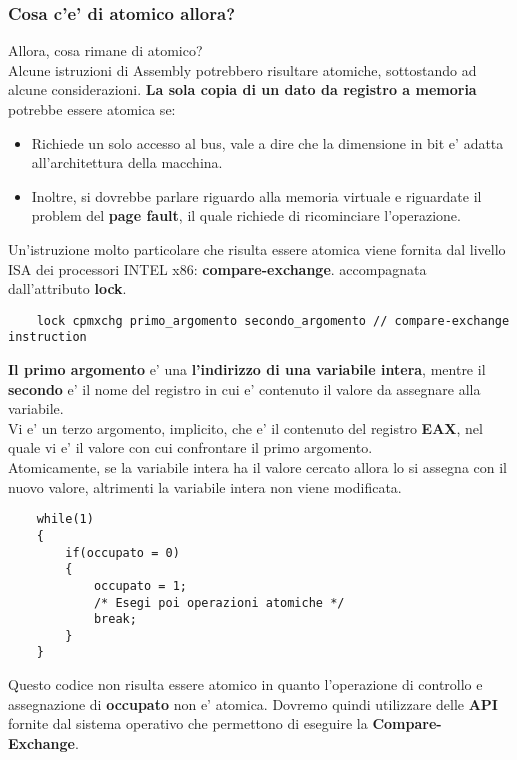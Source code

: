 \documentclass{article}
\begin{document}
        \subsubsection{Cosa c'e' di atomico allora?}
            Allora, cosa rimane di atomico?
            \\
            Alcune istruzioni di Assembly potrebbero risultare atomiche, sottostando ad alcune considerazioni.
            \textbf{La sola copia di un dato da registro a memoria } 
            potrebbe essere atomica se:
            \begin{itemize}
               \item Richiede un solo accesso al bus, vale a dire che 
               la dimensione in bit e' adatta all'architettura della 
               macchina.
               \item Inoltre, si dovrebbe parlare riguardo alla memoria 
                virtuale e riguardate il problem del \textbf{page fault},
                il quale richiede di ricominciare l'operazione.
            \end{itemize}
            Un'istruzione molto particolare che risulta essere atomica
            viene fornita dal livello ISA dei processori INTEL x86: \textbf{compare-exchange}.
            accompagnata dall'attributo \textbf{lock}.
            \\
            \begin{verbatim}
    lock cpmxchg primo_argomento secondo_argomento // compare-exchange instruction 
            \end{verbatim}
            \textbf{Il primo argomento} e' una \textbf{l'indirizzo di una variabile intera},
            mentre il \textbf{secondo} e' il nome del registro in cui e' contenuto
            il valore da assegnare alla variabile.
            \\
            Vi e' un terzo argomento, implicito, che e' il contenuto del registro \textbf{EAX},
            nel quale vi e' il valore con cui confrontare il primo argomento.
            \\
            Atomicamente, se la variabile intera ha il valore cercato allora lo 
            si assegna con il nuovo valore, altrimenti la variabile intera non
            viene modificata.
\newpage
            \begin{verbatim}
    while(1)
    {
        if(occupato = 0)
        {
            occupato = 1;
            /* Esegi poi operazioni atomiche */
            break;
        }
    }
            \end{verbatim}
            Questo codice non risulta essere atomico in quanto 
            l'operazione di controllo e assegnazione di \textbf{occupato}
            non e' atomica.
            Dovremo quindi utilizzare delle \textbf{API} fornite 
            dal sistema operativo che permettono di eseguire la \textbf{Compare-Exchange}.
\end{document}
